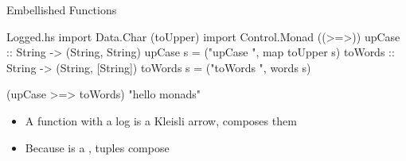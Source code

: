 \begin{frame}{Embellished Functions}
%
\begin{mhsfile}{Logged.hs}
import Data.Char (toUpper)
import Control.Monad ((>=>))
upCase :: String -> (String, String)
upCase s = ("upCase ", map toUpper s)
toWords :: String -> (String, [String])
toWords s = ("toWords ", words s)
\end{mhsfile}
\begin{ghcisession}[start=2]
(upCase >=> toWords) "hello monads"
\end{ghcisession}
\begin{itemize}
   \item<3-> A function with a log is a Kleisli arrow, \ihs{(>=>)} composes them
   \item<4-> Because  is a , tuples  compose\supercite[ch.~4]{milewski2019}
\end{itemize}
\end{frame}
\mhsGhcUnload

